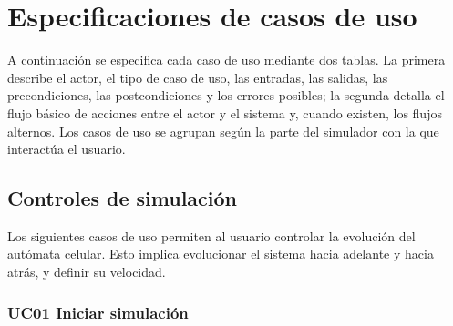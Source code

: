 \compactTableListstrue
\section{Especificaciones de casos de uso}
\label{sec:especificaciones}

A continuación se especifica cada caso de uso mediante dos tablas. La primera describe el actor, el tipo de caso de uso, las entradas, las salidas, las precondiciones, las postcondiciones y los errores posibles; la segunda detalla el flujo básico de acciones entre el actor y el sistema y, cuando existen, los flujos alternos. Los casos de uso se agrupan según la parte del simulador con la que interactúa el usuario.

\subsection{Controles de simulación}

Los siguientes casos de uso permiten al usuario controlar la evolución del autómata celular. Esto implica evolucionar el sistema hacia adelante y hacia atrás, y definir su velocidad.

\subsubsection*{UC01 Iniciar simulación}

